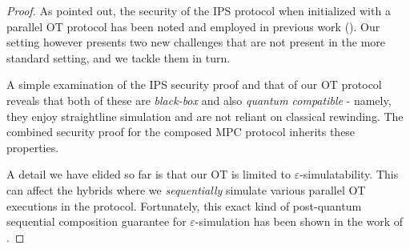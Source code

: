 \begin{proof}
     As pointed out, the security of the IPS protocol when initialized with a parallel OT protocol has been noted and employed in previous work (\cite{FOCS:Wee10,STOC:Goyal11}). Our setting however presents two new challenges that are not present in the more standard setting, and we tackle them in turn. 

     A simple examination of the IPS security proof and that of our OT protocol reveals that both of these are \emph{black-box} and also \emph{quantum compatible} - namely, they enjoy straightline simulation and are not reliant on classical rewinding. 
     The combined security proof for the composed MPC protocol inherits these properties. 

     A detail we have elided so far is that our OT is limited to $\varepsilon$-simulatability. This can affect the hybrids where we \emph{sequentially} simulate various parallel OT executions in the protocol. 
     Fortunately, this exact kind of post-quantum sequential composition guarantee for $\varepsilon$-simulation has been shown in the work of \cite[Section 7.2]{C:CCLY22}. 
     
\end{proof}
 
